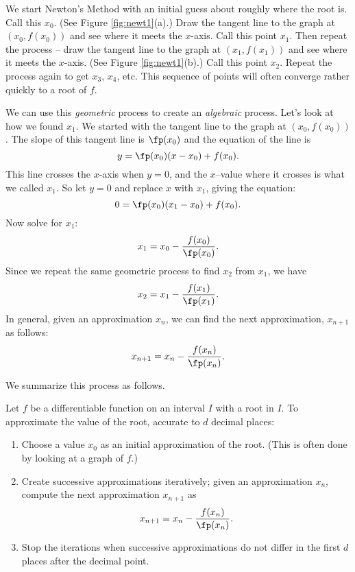 We start Newton's Method with an initial guess about roughly where the root is.  Call this $x_0$. (See Figure \ref{fig:newt1}(a).)  Draw the tangent line to the graph at $(x_0,f(x_0))$ and see where it meets the $x$-axis. Call this point $x_1$.  Then repeat the process -- draw the tangent line to the graph at $(x_1, f(x_1))$ and see where it meets the $x$-axis. (See Figure \ref{fig:newt1}(b).) Call this point $x_2$.  Repeat the process again to get $x_3$, $x_4$, etc.  This sequence of points will often converge rather quickly to a root of $f$.  

We can use this \textit{geometric} process to create an \textit{algebraic} process.  Let's look at how we found $x_1$.  We started with the tangent line to the graph at $(x_0,f(x_0))$.  The slope of this tangent line is $\fp(x_0)$ and the equation of the line is
$$y=\fp(x_0)(x-x_0)+f(x_0).$$
This line crosses the $x$-axis when $y=0$, and the $x$--value where it crosses is what we called $x_1$. So let $y=0$ and replace $x$ with $x_1$, giving the equation: 
$$ 0 = \fp(x_0)(x_1-x_0)+f(x_0).$$ 
Now solve for $x_1$:
$$x_1=x_0-\frac{f(x_0)}{\fp(x_0)}.$$
Since we repeat the same geometric process to find $x_2$ from $x_1$, we have
$$x_2=x_1-\frac{f(x_1)}{\fp(x_1)}.$$
In general, given an approximation $x_n$, we can find the next approximation, $x_{n+1}$ as follows:
$$x_{n+1} = x_{n} - \frac{f(x_{n})}{\fp(x_{n})}.$$

We summarize this process as follows.

{Let $f$ be a differentiable function on an interval $I$ with a root in $I$. To approximate the value of the root, accurate to $d$ decimal places:
	\begin{enumerate}
	\item		Choose a value $x_0$ as an initial approximation of the root. (This is often done by looking at a graph of $f$.)
	\item		Create successive approximations iteratively; given an approximation $x_n$, compute the next approximation $x_{n+1}$ as $$x_{n+1} = x_n - \frac{f(x_n)}{\fp(x_n)}.$$
	\item		Stop the iterations when successive approximations do not differ in the first $d$ places after the decimal point.
		\end{enumerate}
}


